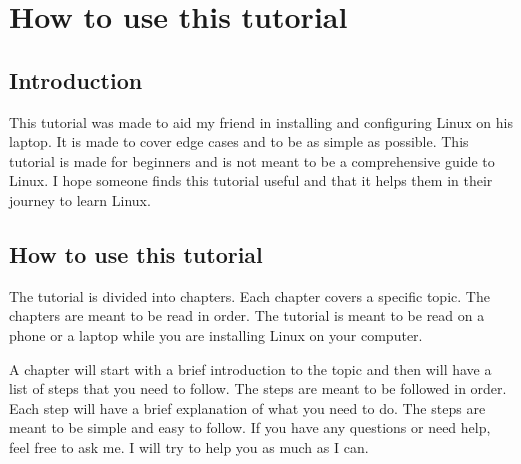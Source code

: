 \documentclass{book}
\begin{document}
\chapter{How to use this tutorial}
\section{Introduction}
This tutorial was made to aid my friend in installing and configuring Linux on his laptop. It is made to cover edge cases and to be as simple as possible. This tutorial is made for beginners and is not meant to be a comprehensive guide to Linux. I hope someone finds this tutorial useful and that it helps them in their journey to learn Linux.

\section{How to use this tutorial}
The tutorial is divided into chapters. Each chapter covers a specific topic. The chapters are meant to be read in order. The tutorial is meant to be read on a phone or a laptop while you are installing Linux on your computer.\par

A chapter will start with a brief introduction to the topic and then will have a list of steps that you need to follow. The steps are meant to be followed in order. Each step will have a brief explanation of what you need to do. The steps are meant to be simple and easy to follow. If you have any questions or need help, feel free to ask me. I will try to help you as much as I can.\par




\end{document}
